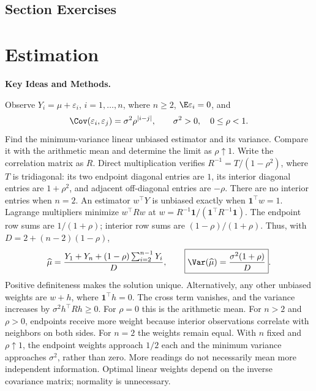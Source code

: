 \par{}
\subsection*{Section Exercises}



\section{Estimation}
\noindent\textbf{Key Ideas and Methods.}\enspace



Observe $Y_i=\mu+\varepsilon_i$, $i=1,\ldots,n$, where $n\ge2$, $\E\varepsilon_i=0$, and
\[
 \Cov(\varepsilon_i,\varepsilon_j)=\sigma^2\rho^{|i-j|},
 \qquad \sigma^2>0,\quad0\le\rho<1.
\]
Find the minimum-variance linear unbiased estimator and its variance. Compare it with the arithmetic mean and determine the limit as $\rho\uparrow1$.
\solution Write the correlation matrix as $R$. Direct multiplication verifies $R^{-1}=T/(1-\rho^2)$, where $T$ is tridiagonal: its two endpoint diagonal entries are $1$, its interior diagonal entries are $1+\rho^2$, and adjacent off-diagonal entries are $-\rho$. There are no interior entries when $n=2$.
An estimator $w^\top Y$ is unbiased exactly when $\mathbf1^\top w=1$. Lagrange multipliers minimize $w^\top Rw$ at $w=R^{-1}\mathbf1/(\mathbf1^\top R^{-1}\mathbf1)$. The endpoint row sums are $1/(1+\rho)$; interior row sums are $(1-\rho)/(1+\rho)$. Thus, with $D=2+(n-2)(1-\rho)$,
\[
 \widehat\mu=\frac{Y_1+Y_n+(1-\rho)\sum_{i=2}^{n-1}Y_i}{D},
 \qquad
 \boxed{\Var(\widehat\mu)=\frac{\sigma^2(1+\rho)}{D}}.
\]
Positive definiteness makes the solution unique. Alternatively, any other unbiased weights are $w+h$, where $\mathbf1^\top h=0$. The cross term vanishes, and the variance increases by $\sigma^2h^\top Rh\ge0$.
For $\rho=0$ this is the arithmetic mean. For $n>2$ and $\rho>0$, endpoints receive more weight because interior observations correlate with neighbors on both sides. For $n=2$ the weights remain equal. With $n$ fixed and $\rho\uparrow1$, the endpoint weights approach $1/2$ each and the minimum variance approaches $\sigma^2$, rather than zero.
\insight More readings do not necessarily mean more independent information. Optimal linear weights depend on the inverse covariance matrix; normality is unnecessary.

